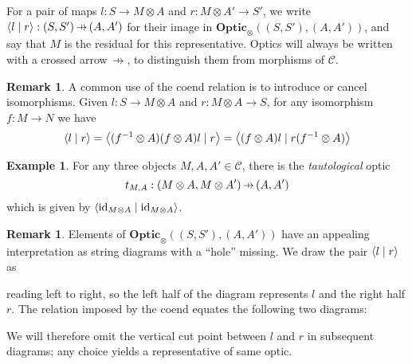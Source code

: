 \documentclass[11pt,letterpaper]{article}
\theoremstyle{plain}
\theoremstyle{definition}
\newtheorem{example}[theorem]{Example}
\newtheorem{remark}[theorem]{Remark}
\newcommand{\C}{\mathscr{C}}
\newcommand{\Optic}{\mathbf{Optic}}
\newcommand{\id}{\mathrm{id}}
\newcommand{\rep}[2]{{\ensuremath \left\langle #1 \mid #2 \right\rangle}}
\newcommand{\hto}{\ensuremath{\,\mathaccent\shortmid\rightarrow\,}}
\begin{document}
For a pair of maps $l : S \to M \otimes A$ and $r : M \otimes A' \to S'$, we write $\rep{l}{r} : (S, S') \hto (A, A')$ for their image in $\Optic_\otimes((S, S'), (A, A'))$, and say that $M$ is the residual for this representative. Optics will always be written with a crossed arrow $\hto$, to distinguish them from morphisms of $\C$.

\begin{remark}
A common use of the coend relation is to introduce or cancel isomorphisms. Given $l : S \to M \otimes A$ and $r : M \otimes A \to S$, for any isomorphism $f : M \to N$ we have
\begin{align*}
\rep{l}{r} = \rep{(f^{-1} \otimes A)(f \otimes A)l}{r} = \rep{(f \otimes A)l}{r(f^{-1} \otimes A)}
\end{align*}
\end{remark}

\begin{example}
  For any three objects $M, A, A' \in \C$, there is the \emph{tautological} optic \[t_{M,A} : (M \otimes A, M \otimes A') \hto (A, A')\] which is given by $\rep{\id_{M \otimes A}}{\id_{M \otimes A}}$.
\end{example}

\begin{remark}
  Elements of $\Optic_\otimes((S, S'), (A, A'))$ have an appealing
  interpretation as string diagrams with a ``hole'' missing. We draw the
  pair $\rep{l}{r}$ as
  \begin{center}
    
  \end{center}
  reading left to right, so the left half of the diagram represents $l$ and the right half $r$. The relation imposed by the coend equates the following two diagrams:
  \begin{center}
    
    \qquad
    
  \end{center}
  We will therefore omit the vertical cut point between $l$ and $r$ in subsequent diagrams; any choice yields a representative of same optic.
\end{remark}
\end{document}
